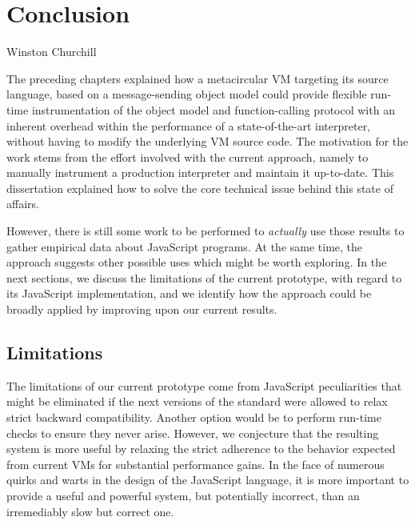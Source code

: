 \chapter{Conclusion}
\label{chap:Conclusion}


{Winston Churchill}


The preceding chapters explained how a metacircular VM targeting its source
language, based on a message-sending object model could provide flexible
run-time instrumentation of the object model and function-calling protocol with
an inherent overhead within the performance of a state-of-the-art interpreter,
without having to modify the underlying VM source code. The motivation for the
work stems from the effort involved with the current approach, namely to
manually instrument a production interpreter and maintain it up-to-date. This
dissertation explained how to solve the core technical issue behind this state
of affairs. 

However, there is still some work to be performed to \textit{actually} use
those results to gather empirical data about JavaScript programs. At the same
time, the approach suggests other possible uses which might be worth exploring.
In the next sections, we discuss the limitations of the current prototype, with
regard to its JavaScript implementation, and we identify how the approach could
be broadly applied by improving upon our current results.

\section{Limitations}

The limitations of our current prototype come from JavaScript peculiarities
that might be eliminated if the next versions of the standard were
allowed to relax strict backward compatibility. Another option would be
to perform run-time checks to ensure they never arise.  However, we conjecture
that the resulting system is more useful by relaxing the strict adherence to
the behavior expected from current VMs for substantial performance gains.  In
the face of numerous quirks and warts in the design of the JavaScript language,
it is more important to provide a useful and powerful system, but potentially
incorrect, than an irremediably slow but correct one.

